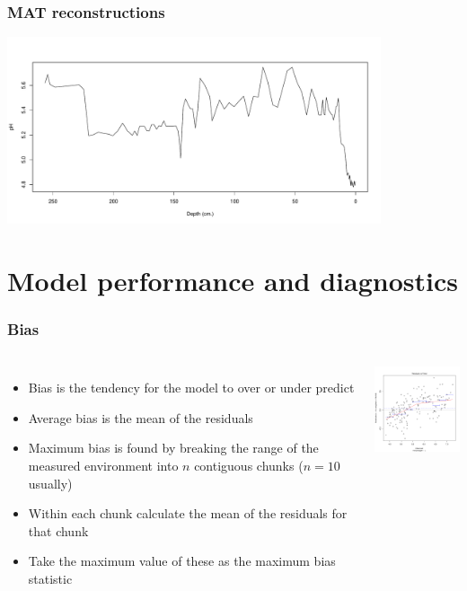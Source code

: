 \documentclass{beamer}
\begin{document}
\begin{frame}[fragile]
    \frametitle{MAT reconstructions}
    \scriptsize
\begin{Schunk}
\begin{Sinput}
[0;34mr$>[0m reconPlot(rlgh.mat, use.labels = TRUE, ylab = "pH", xlab = "Depth (cm.)")
\end{Sinput}
\end{Schunk}
    \normalsize
    \begin{center}
        \includegraphics[width=11cm]{mat_reconPlot}
    \end{center}
\end{frame}

\section{Model performance and diagnostics}

\begin{frame}
    \frametitle{Bias}
    \begin{columns}
        \column{7cm}
        \begin{itemize}
            \item Bias is the tendency for the model to over or under predict
            \item Average bias is the mean of the residuals
            \item Maximum bias is found by breaking the range of the measured environment into $n$ contiguous chunks ($n = 10$ usually)
            \item Within each chunk calculate the mean of the residuals for that chunk
            \item Take the maximum value of these as the maximum bias statistic
        \end{itemize}

        \column{5cm}
        \includegraphics[width=5cm]{mat_bias_plot}
    \end{columns}
\end{frame}
\end{document}
